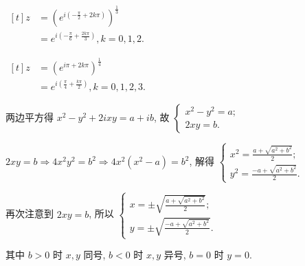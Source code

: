 \documentclass{homework}
\begin{document}
\(\begin{aligned}[t]z&=\left(e^{i(-\frac{\pi}{2}+2k\pi)}\right)^{\frac{1}{3}}\\&=e^{i(-\frac{\pi}{6}+\frac{2k\pi}{3})}, k=0,1,2.\end{aligned}\)

\(\begin{aligned}[t]z&=\left(e^{i\pi+2k\pi}\right)^{\frac{1}{4}}\\&=e^{i(\frac{\pi}{4}+\frac{k\pi}{2})}, k=0,1,2,3.\end{aligned}\)

两边平方得 \(x^2-y^2+2ixy=a+ib\), 故
\(\begin{cases}x^2-y^2=a;\\2xy=b.\end{cases}\)

\(2xy=b \Rightarrow 4x^2y^2=b^2 \Rightarrow 4x^2(x^2-a)=b^2\),
解得 $\begin{cases}x^2=\frac{a+\sqrt{a^2+b^2}}{2};\\y^2=\frac{-a+\sqrt{a^2+b^2}}{2}.\end{cases}$

再次注意到 \(2xy=b\), 所以 \(\begin{cases}x=\pm\sqrt{\frac{a+\sqrt{a^2+b^2}}{2}};\\y=\pm\sqrt{\frac{-a+\sqrt{a^2+b^2}}{2}}.\end{cases}\)

其中 \(b>0\) 时 \(x,y\) 同号, \(b<0\) 时 \(x,y\) 异号, \(b=0\) 时 \(y=0\).
\end{document}
